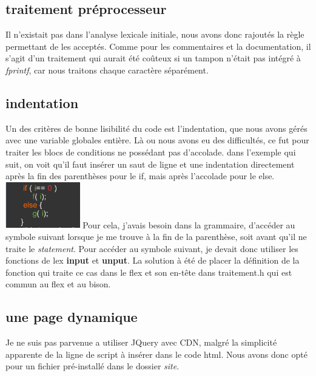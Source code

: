 \documentclass[10pt,a4paper]{report}
\begin{document}
\subsection{traitement préprocesseur}
Il n'existait pas dans l'analyse lexicale initiale, nous avons donc rajoutés la règle permettant de les acceptés. Comme pour les commentaires et la documentation, il s'agit d'un traitement qui aurait été coûteux si un tampon n'était pas intégré à \textit{fprintf}, car nous traitons chaque caractère séparément. 

\subsection{indentation}
	Un des critères de bonne lisibilité du code est l'indentation, que nous avons gérés avec une variable globales entière. Là ou nous avons eu des difficultés, ce fut pour traiter les blocs de conditions ne possédant pas d'accolade.
	\newline
	dans l'exemple qui suit, on voit qu'il faut insérer un saut de ligne et une indentation directement après la fin des parenthèses pour le if, mais après l'accolade pour le else. \newline
	\includegraphics[height=2cm]{site/indent1.png} 
	\newline 
Pour cela, j'avais besoin dans la grammaire, d'accéder au symbole suivant lorsque je me trouve à la fin de la parenthèse, soit avant qu'il ne traite le \textit{statement}. \newline 
Pour accéder au symbole suivant, je devait donc utiliser les fonctions de lex \textbf{input} et \textbf{unput}. \newline
La solution à été de placer la définition de la fonction qui traite ce cas dans le flex et son en-tête dans traitement.h qui est commun au flex et au bison.

\subsection{une page dynamique}
Je ne suis pas parvenue a utiliser JQuery avec CDN, malgré la simplicité apparente de la ligne de script à insérer dans le code html. Nous avons donc opté pour un fichier pré-installé dans le dossier \textit{site}. \newline
\end{document}

